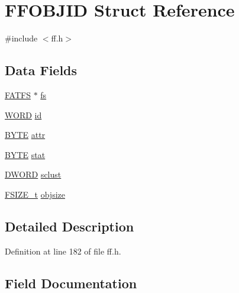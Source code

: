 \hypertarget{structFFOBJID}{}\section{F\+F\+O\+B\+J\+ID Struct Reference}
\label{structFFOBJID}


{\ttfamily \#include $<$ff.\+h$>$}

\subsection*{Data Fields}
\begin{DoxyCompactItemize}
\item 
\hyperlink{structFATFS}{F\+A\+T\+FS} $\ast$ \hyperlink{structFFOBJID_a867089659a2374d44ab917c60037fe5c}{fs}
\item 
\hyperlink{ff_8h_a197942eefa7db30960ae396d68339b97}{W\+O\+RD} \hyperlink{structFFOBJID_afc765e01ff97bfd9645c42b0ba30397f}{id}
\item 
\hyperlink{ff_8h_a4ae1dab0fb4b072a66584546209e7d58}{B\+Y\+TE} \hyperlink{structFFOBJID_ae9b1e6f98dbad367cc00f92b87f8d279}{attr}
\item 
\hyperlink{ff_8h_a4ae1dab0fb4b072a66584546209e7d58}{B\+Y\+TE} \hyperlink{structFFOBJID_aa7bfa8dd8958d11df042a67e1da25f63}{stat}
\item 
\hyperlink{ff_8h_ad342ac907eb044443153a22f964bf0af}{D\+W\+O\+RD} \hyperlink{structFFOBJID_ad990393e2ddf16f73671ded4b751becb}{sclust}
\item 
\hyperlink{ff_8h_a3fc0992ad7436250b6b1a0592214b7f2}{F\+S\+I\+Z\+E\+\_\+t} \hyperlink{structFFOBJID_a83c51ba99687054f0cc653b45f195268}{objsize}
\end{DoxyCompactItemize}


\subsection{Detailed Description}


Definition at line 182 of file ff.\+h.



\subsection{Field Documentation}
\mbox{\label{structFFOBJID_ae9b1e6f98dbad367cc00f92b87f8d279}} 
